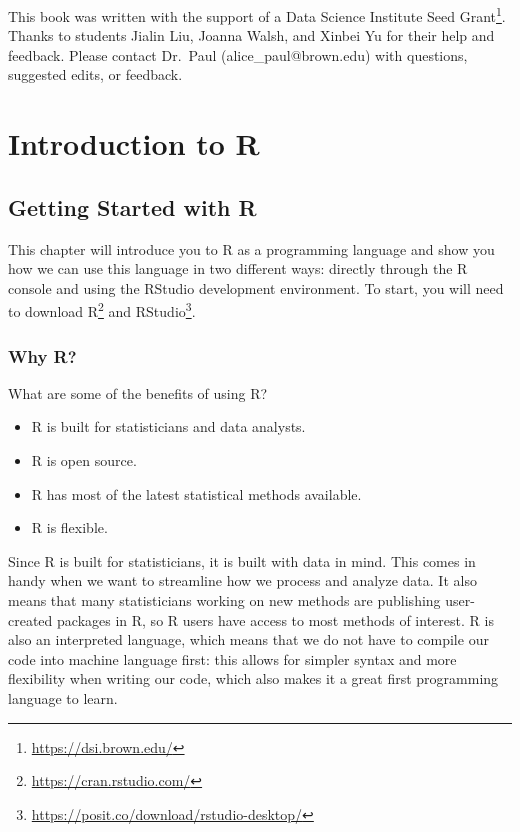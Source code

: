 \documentclass[
  letterpaper,
]{krantz}
\providecommand{\tightlist}{%
  \setlength{\itemsep}{0pt}\setlength{\parskip}{0pt}}\usepackage{longtable,booktabs,array}
\renewcommand{\href}[2]{#2\footnote{\url{#1}}}
\begin{document}

This book was written with the support of a
\href{https://dsi.brown.edu/}{Data Science Institute Seed Grant}. Thanks
to students Jialin Liu, Joanna Walsh, and Xinbei Yu for their help and
feedback. Please contact Dr.~Paul (alice\_paul@brown.edu) with
questions, suggested edits, or feedback.

\mainmatter

\part{Introduction to R}

\chapter{Getting Started with R}\label{sec-intro-to-r}

This chapter will introduce you to R as a programming language and show
you how we can use this language in two different ways: directly through
the R console and using the RStudio development environment. To start,
you will need to download \href{https://cran.rstudio.com/}{R} and
\href{https://posit.co/download/rstudio-desktop/}{RStudio}.

\section{Why R?}\label{why-r}

What are some of the benefits of using R?

\begin{itemize}
\tightlist
\item
  R is built for statisticians and data analysts.\\
\item
  R is open source.\\
\item
  R has most of the latest statistical methods available.\\
\item
  R is flexible.
\end{itemize}

Since R is built for statisticians, it is built with data in mind. This
comes in handy when we want to streamline how we process and analyze
data. It also means that many statisticians working on new methods are
publishing user-created packages in R, so R users have access to most
methods of interest. R is also an interpreted language, which means that
we do not have to compile our code into machine language first: this
allows for simpler syntax and more flexibility when writing our code,
which also makes it a great first programming language to learn.
\end{document}
